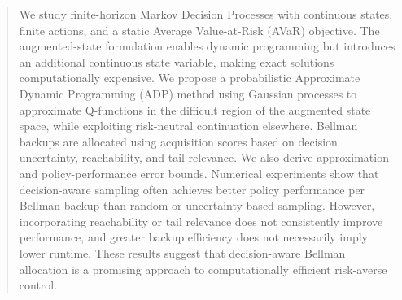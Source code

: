\begin{abstract}
We study finite-horizon Markov Decision Processes with continuous states, finite actions, and a static Average Value-at-Risk (AVaR) objective. The augmented-state formulation enables dynamic programming but introduces an additional continuous state variable, making exact solutions computationally expensive. We propose a probabilistic Approximate Dynamic Programming (ADP) method using Gaussian processes to approximate Q-functions in the difficult region of the augmented state space, while exploiting risk-neutral continuation elsewhere. Bellman backups are allocated using acquisition scores based on decision uncertainty, reachability, and tail relevance. We also derive approximation and policy-performance error bounds. Numerical experiments show that decision-aware sampling often achieves better policy performance per Bellman backup than random or uncertainty-based sampling. However, incorporating reachability or tail relevance does not consistently improve performance, and greater backup efficiency does not necessarily imply lower runtime. These results suggest that decision-aware Bellman allocation is a promising approach to computationally efficient risk-averse control.
\end{abstract}